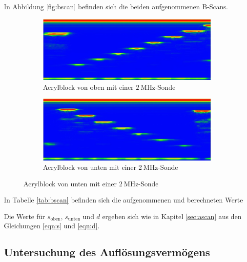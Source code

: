 In Abbildung \ref{fig:bscan} befinden sich die beiden aufgenommenen B-Scans.
\begin{figure}[H]
  \caption{Mit dem B-Scan untersuchter Acrylblock}
  \label{fig:bscan}
  \centering
        \begin{subfigure}[b]{\textwidth}
                \centering
                \includegraphics[width=\textwidth]{Scan-Bilder/bscanoben.jpg}
                \caption{Acrylblock von oben mit einer $\SI{2}{\MHz}$-Sonde}
                \label{fig:oben}
        \end{subfigure}
        \quad
        \begin{subfigure}[b]{\textwidth}
                \centering
                \includegraphics[width=\textwidth]{Scan-Bilder/bscanunten.jpg}
                \caption{Acrylblock von unten mit einer $\SI{2}{\MHz}$-Sonde}
                \label{fig:unten}
        \end{subfigure}
\end{figure}

In Tabelle \ref{tab:bscan} befinden sich die aufgenommenen und berechneten Werte


Die Werte für $s_\text{oben}$, $s_\text{unten}$ und $d$ ergeben sich wie in Kapitel \ref{sec:ascan} aus den Gleichungen \eqref{eqn:s}
und \eqref{eqn:d}.

\subsection{Untersuchung des Auflösungsvermögens \label{sec:auf}}

